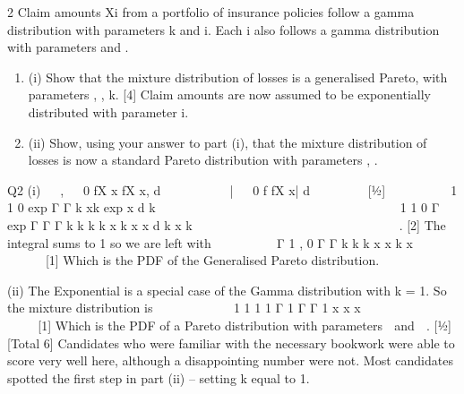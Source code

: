 \documentclass[a4paper,12pt]{article}
\begin{document}
 2 Claim amounts Xi from a portfolio of insurance policies follow a gamma distribution
with parameters k and \lambda  i. Each \lambda  i also follows a gamma distribution with parameters
\alpha and \beta .
\begin{enumerate}


\item
(i) Show that the mixture distribution of losses is a generalised Pareto, with
parameters \alpha, \beta , k. [4]
Claim amounts are now assumed to be exponentially distributed with parameter \lambda  i.
\item (ii) Show, using your answer to part (i), that the mixture distribution of losses is
now a standard Pareto distribution with parameters \alpha, \beta .
\end{enumerate}
\newpage

Q2 (i)   ,  
0
fX x fX x, d

       |  
0
f fX x| d

      [½]
        1 1
0
exp
Γ Γ
k
xk exp x d
k
 
   
   
 
   
 
 
  
      1
1
0
Γ
exp
Γ Γ Γ
k k
k
k
x k x x d
k x k
   
 

    
      
      . [2]
The integral sums to 1 so we are left with
 
     
Γ 1
, 0
Γ Γ
k
k
k x x
k x
 

  

  
[1]
Which is the PDF of the Generalised Pareto distribution.

(ii) The Exponential is a special case of the Gamma distribution with k = 1. 
So the mixture distribution is
 
       
1 1
1 1
Γ 1
Γ Γ 1
x
x x
  
 
   

    
[1]
Which is the PDF of a Pareto distribution with parameters  and  . [½]
[Total 6]
Candidates who were familiar with the necessary bookwork were able to
score very well here, although a disappointing number were not. Most
candidates spotted the first step in part (ii) – setting k equal to 1.
\end{document}
